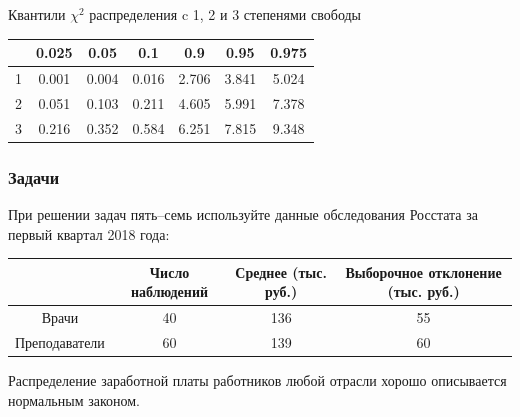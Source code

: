 	\begin{center}
	Квантили $\chi^2$ распределения c 1, 2 и 3 степенями свободы\\
		\begin{tabular}{c|cccccc}
			\toprule
			& 0.025 & 0.05 & 0.1 & 0.9 & 0.95 & 0.975\\
			\midrule
							1 & 0.001 & 0.004 & 0.016 & 2.706 & 3.841 & 5.024 \\
							2 & 0.051 & 0.103 & 0.211 & 4.605 & 5.991 & 7.378 \\
							3 & 0.216 & 0.352 & 0.584 & 6.251 & 7.815 & 9.348 \\
			\bottomrule
		\end{tabular}
	\end{center}

\newpage

\subsubsection{Задачи}

При решении задач пять–семь используйте данные обследования Росстата за первый квартал 2018 года:

	\begin{center}
		\begin{tabular}{c|ccc}
			\toprule
			& Число наблюдений & Среднее (тыс. руб.) & Выборочное отклонение (тыс. руб.) \\
			\midrule
							Врачи & 40 & 136 & 55  \\
							Преподаватели & 60 & 139 & 60 \\
			\bottomrule
		\end{tabular}
	\end{center}

Распределение заработной платы работников любой отрасли хорошо описывается нормальным законом.

